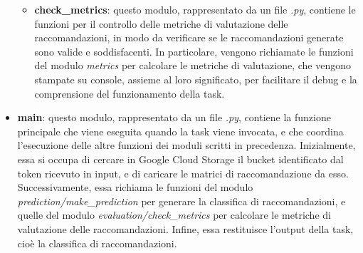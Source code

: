 \begin{itemize}
\begin{itemize}
        \item \textbf{check\_metrics}: questo modulo, rappresentato da un file \emph{.py}, contiene le funzioni per il controllo delle metriche di valutazione delle raccomandazioni, in modo da verificare se le raccomandazioni generate sono valide e soddisfacenti. In particolare, vengono richiamate le funzioni del modulo \emph{metrics} per calcolare le metriche di valutazione, che vengono stampate su console, assieme al loro significato, per facilitare il debug e la comprensione del funzionamento della task.
    \end{itemize}
    \item \textbf{main}: questo modulo, rappresentato da un file \emph{.py}, contiene la funzione principale che viene eseguita quando la task viene invocata, e che coordina l'esecuzione delle altre funzioni dei moduli scritti in precedenza. Inizialmente, essa si occupa di cercare in Google Cloud Storage il bucket identificato dal token ricevuto in input, e di caricare le matrici di raccomandazione da esso. Successivamente, essa richiama le funzioni del modulo \emph{prediction/make\_prediction} per generare la classifica di raccomandazioni, e quelle del modulo \emph{evaluation/check\_metrics} per calcolare le metriche di valutazione delle raccomandazioni. Infine, essa restituisce l'output della task, cioè la classifica di raccomandazioni.
\end{itemize}

